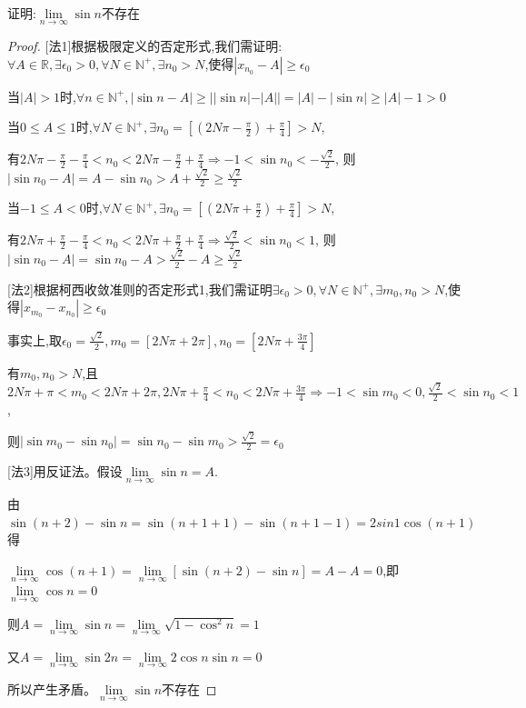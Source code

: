 \begin{example}
    证明:$\lim \limits_{n \to \infty} \sin n$不存在
\end{example}

\begin{proof}
    
    [法1]根据极限定义的否定形式,我们需证明:$ \forall A \in \mathbb{R}, \exists \epsilon_0 > 0,\forall N\in \mathbb{N}^+,\exists n_0 > N$,使得$|x_{n_0}-A|\ge \epsilon_0$

    当$|A|>1$时,$\forall n\in \mathbb{N}^+,|\sin n - A| \ge ||\sin n|-|A||=|A|-|\sin n|\ge |A|-1>0$

    当$0\le A \le 1$时,$\forall N\in \mathbb{N}^+,\exists n_0=[(2N\pi - \frac{\pi}{2})+\frac{\pi}{4}]>N$,
    
    有$2N\pi - \frac{\pi}{2}-\frac{\pi}{4} < n_0 < 2N\pi -\frac{\pi}{2}+\frac{\pi}{4} \Longrightarrow -1 < \sin n_0 < -\frac{\sqrt{2}}{2}$,
    则$|\sin n_0 -A|=A-\sin n_0 > A+\frac{\sqrt{2}}{2}\ge \frac{\sqrt{2}}{2}$

    当$-1\le A<0$时,$\forall N\in \mathbb{N}^+,\exists n_0=[(2N\pi + \frac{\pi}{2})+\frac{\pi}{4}]>N$,
    
    有$2N\pi + \frac{\pi}{2}-\frac{\pi}{4} < n_0 < 2N\pi +\frac{\pi}{2}+\frac{\pi}{4} \Longrightarrow \frac{\sqrt{2}}{2} < \sin n_0 < 1 $,
    则$|\sin n_0 -A|=\sin n_0 - A > \frac{\sqrt{2}}{2} - A \ge \frac{\sqrt{2}}{2}$

    [法2]根据柯西收敛准则的否定形式1,我们需证明$\exists \epsilon_0 > 0,\forall N\in \mathbb{N}^+,\exists m_0,n_0 > N$,使得$|x_{m_0}-x_{n_0}|\ge \epsilon_0 $

    事实上,取$\epsilon_0=\frac{\sqrt{2}}{2},m_0=[2N\pi + 2\pi] ,n_0=[2N\pi + \frac{3\pi}{4}]$

    有$m_0,n_0>N$,且$2N\pi + \pi <m_0< 2N\pi + 2\pi,2N\pi +\frac{\pi}{4}<n_0<2N\pi + \frac{3\pi}{4}\Longrightarrow -1<\sin m_0<0,\frac{\sqrt{2}}{2}<\sin n_0<1$,
    
    则$|\sin m_0-\sin n_0|=\sin n_0-\sin m_0>\frac{\sqrt{2}}{2}=\epsilon_0$

    [法3]用反证法。假设$\lim \limits_{n \to \infty} \sin n=A$.
    
    由$\sin(n+2)-\sin n=\sin(n+1+1)-\sin (n+1-1)=2sin 1 \cos (n+1)$得
    
    $\lim \limits_{n \to \infty} \cos (n+1)=\lim \limits_{n \to \infty} [\sin(n+2)-\sin n]=A-A=0$,即$\lim \limits_{n \to \infty} \cos n = 0$

    则$A=\lim \limits_{n \to \infty} \sin n = \lim \limits_{n \to \infty} \sqrt{1-\cos^2 n} = 1$

    又$A=\lim \limits_{n \to \infty} \sin 2n=\lim \limits_{n \to \infty} 2\cos n \sin n = 0$

    所以产生矛盾。$\lim \limits_{n \to \infty} \sin n$不存在
\end{proof}





